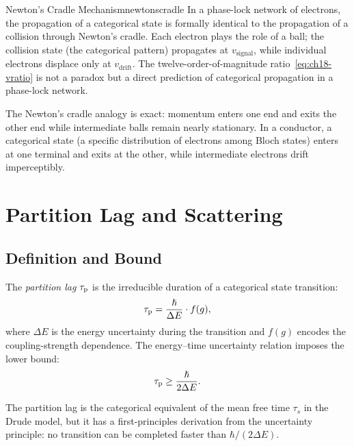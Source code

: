 \begin{consequence}{Newton's Cradle Mechanism}{newtonscradle}
In a phase-lock network of electrons, the propagation of a categorical
state is formally identical to the propagation of a collision through
Newton's cradle.  Each electron plays the role of a ball; the collision
state (the categorical pattern) propagates at $v_{\mathrm{signal}}$, while
individual electrons displace only at $v_{\mathrm{drift}}$.  The
twelve-order-of-magnitude ratio~\eqref{eq:ch18-vratio} is not a paradox
but a direct prediction of categorical propagation in a phase-lock network.
\end{consequence}

The Newton's cradle analogy is exact: momentum enters one end and exits the
other end while intermediate balls remain nearly stationary.  In a
conductor, a categorical state (a specific distribution of electrons among
Bloch states) enters at one terminal and exits at the other, while
intermediate electrons drift imperceptibly.

\section{Partition Lag and Scattering}
\label{sec:ch18-partitionlag}

\subsection{Definition and Bound}

\begin{definition}
\label{def:ch18-partlag}
The \emph{partition lag} $\tau_{\mathrm{p}}$ is the irreducible duration of a
categorical state transition:
\begin{equation}
  \tau_{\mathrm{p}} = \frac{\hslash}{\Delta E}\cdot f(g),
  \label{eq:ch18-taup}
\end{equation}
where $\Delta E$ is the energy uncertainty during the transition and $f(g)$
encodes the coupling-strength dependence.  The energy--time uncertainty
relation imposes the lower bound:
\begin{equation}
  \tau_{\mathrm{p}} \geq \frac{\hslash}{2\Delta E}.
  \label{eq:ch18-taupbound}
\end{equation}
\end{definition}

The partition lag is the categorical equivalent of the mean free time
$\tau_s$ in the Drude model, but it has a first-principles derivation from
the uncertainty principle: no transition can be completed faster than
$\hbar/(2\Delta E)$.

